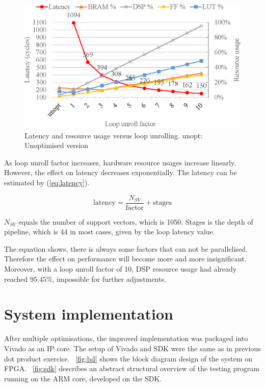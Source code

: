 \documentclass[journal]{IEEEtran}
\newcommand{\fref}[1]{\figurename~\ref{#1}}
\newcommand{\eref}[1]{(\ref{#1})}
\begin{document}
\begin{figure}[ht]
	\centering
	\includegraphics[width=0.9\columnwidth]{latency}
	\caption{Latency and resource usage versus loop unrolling. unopt: Unoptimised version}
	\label{fig:latency}
\end{figure}

As loop unroll factor increases, hardware resource usages increase linearly. However, the effect on latency decreases exponentially. The latency can be estimated by \eref{eq:latency}.

\begin{equation}
	\text{latency} = \frac{N_{SV}}{\text{factor}} + \text{stages}
	\label{eq:latency}
\end{equation}

$N_{SV}$ equals the number of support vectors, which is 1050. Stages is the depth of pipeline, which is 44 in most cases, given by the loop latency value.

The equation shows, there is always some factors that can not be parallelised. Therefore the effect on performance will become more and more insignificant. Moreover, with a loop unroll factor of 10, DSP resource usage had already reached $95.45 \%$, impossible for further adjustments.


\section{System implementation}

After multiple optimisations, the improved implementation was packaged into Vivado as an IP core. The setup of Vivado and SDK were the same as in previous dot product exercise. \fref{fig:bd} shows the block diagram design of the system on FPGA. \fref{fig:sdk} describes an abstract structural overview of the testing program running on the ARM core, developed on the SDK.
\end{document}
